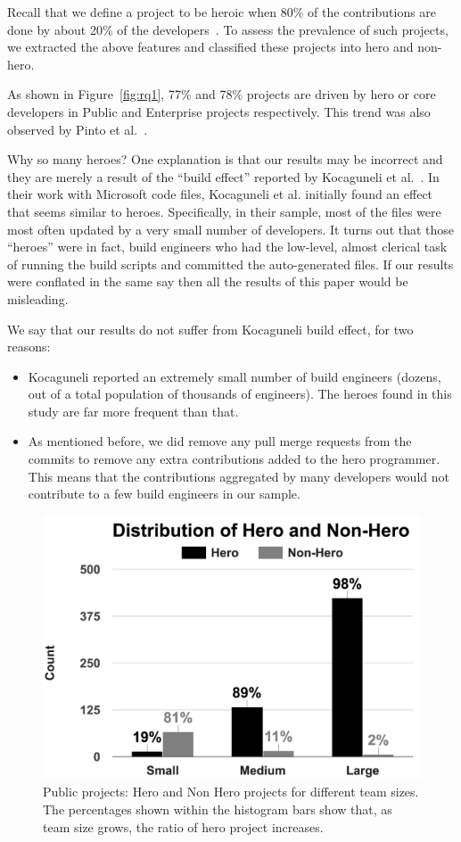 \documentclass[sigconf]{acmart}
\newcommand{\bi}{\begin{itemize}[leftmargin=0.4cm]}
\newcommand{\ei}{\end{itemize}}
\theoremstyle{break}
\begin{document}
Recall that we define a  project to be heroic when 80\% of the contributions are done by about 20\% of the developers~\cite{yamashita2015revisiting}. To
assess
the prevalence of such projects,
we extracted the above features and classified these projects into hero and non-hero. 

As shown in Figure~\ref{fig:rq1},  77\% and 78\% projects are driven by hero or core developers in Public and Enterprise projects respectively. This trend was also observed by Pinto et al.~\cite{pinto2016more}. 

Why so many heroes?  One explanation is that our results may be incorrect and they are merely a result of the   ``build effect'' reported by Kocaguneli et al.~\cite{ekrem13}.
In their work with Microsoft code files, Kocaguneli et al. initially found an effect that seems similar to heroes. Specifically, in their sample,
most of the files were most often updated by a very small number of developers. It turns out that those ``heroes'' were in fact,   build engineers who had the low-level, almost clerical task of running the build scripts and committed the auto-generated files.
If our results were conflated in the same say then all the results of this paper would be misleading.

We say that our results do not suffer from Kocaguneli build effect, for two reasons:
\bi
\item Kocaguneli reported an extremely small number of build engineers (dozens, out of a total population of thousands of engineers). 
The heroes found in this study
are far more frequent than that.
\item As mentioned before, we did remove any pull merge requests from the commits to remove any extra contributions added to the hero programmer. This means that the contributions aggregated by many developers would not contribute to a few build engineers in our sample.
\ei 


\label{sec:rq2}
 \begin{figure}[!t]
  \centering
\includegraphics[width=.5\linewidth]{./fig/rq2a.png}
  \caption{ Public projects:  Hero and Non Hero projects for different team sizes. The percentages shown within the histogram bars show that,  as
  team size grows, the ratio of hero project increases.}
  \label{fig:rq2a}
\end{figure}
\end{document}
